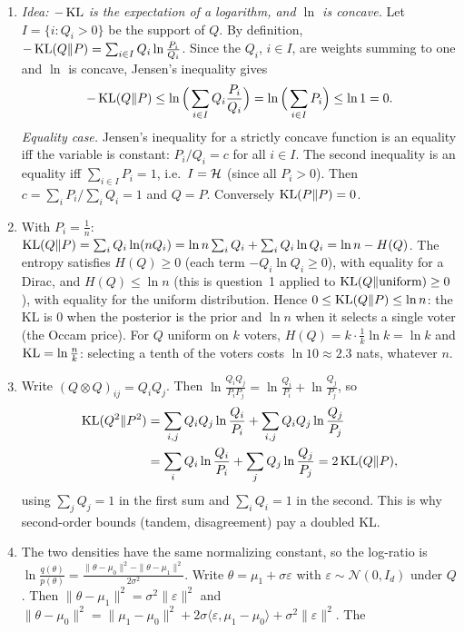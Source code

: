 \documentclass[11pt]{article}
\begin{document}
\begin{solution}
\begin{enumerate}
\item \emph{Idea: $-\operatorname{KL}$ is the expectation of a logarithm, and $\ln$ is concave.} Let $I=\{i:Q_i>0\}$ be the
      support of $Q$. By definition, $-\operatorname{KL}(Q\|P)=\sum_{i\in I}Q_i\ln\frac{P_i}{Q_i}$. Since the $Q_i$, $i\in I$, are
      weights summing to one and $\ln$ is concave, Jensen's inequality gives
      \[-\operatorname{KL}(Q\|P)\leq\ln\Big(\sum_{i\in I}Q_i\frac{P_i}{Q_i}\Big)=\ln\Big(\sum_{i\in I}P_i\Big)\leq\ln1=0.\]
      \emph{Equality case.} Jensen's inequality for a strictly concave function is an equality iff the variable is
      constant: $P_i/Q_i=c$ for all $i\in I$. The second inequality is an equality iff $\sum_{i\in I}P_i=1$, i.e.\
      $I=\mathcal{H}$ (since all $P_i>0$). Then $c=\sum_iP_i/\sum_iQ_i=1$ and $Q=P$. Conversely $\operatorname{KL}(P\|P)=0$.
\item With $P_i=\frac1n$: $\operatorname{KL}(Q\|P)=\sum_iQ_i\ln(nQ_i)=\ln n\sum_iQ_i+\sum_iQ_i\ln Q_i=\ln n-H(Q)$.
      The entropy satisfies $H(Q)\geq0$ (each term $-Q_i\ln Q_i\geq0$), with equality for a Dirac, and
      $H(Q)\leq\ln n$ (this is question~1 applied to $\operatorname{KL}(Q\|\text{uniform})\geq0$), with equality for the uniform
      distribution. Hence $0\leq\operatorname{KL}(Q\|P)\leq\ln n$: the KL is $0$ when the posterior is the prior and $\ln n$ when it
      selects a single voter (the Occam price). For $Q$ uniform on $k$ voters, $H(Q)=k\cdot\frac1k\ln k=\ln k$ and
      $\operatorname{KL}=\ln\frac nk$: selecting a tenth of the voters costs $\ln10\approx2.3$ nats, whatever $n$.
\item Write $(Q\otimes Q)_{ij}=Q_iQ_j$. Then $\ln\frac{Q_iQ_j}{P_iP_j}=\ln\frac{Q_i}{P_i}+\ln\frac{Q_j}{P_j}$, so
      \begin{align*}\operatorname{KL}(Q^2\|P^2)&=\sum_{i,j}Q_iQ_j\ln\frac{Q_i}{P_i}+\sum_{i,j}Q_iQ_j\ln\frac{Q_j}{P_j}\\
      &=\sum_iQ_i\ln\frac{Q_i}{P_i}+\sum_jQ_j\ln\frac{Q_j}{P_j}=2\operatorname{KL}(Q\|P),\end{align*}
      using $\sum_jQ_j=1$ in the first sum and $\sum_iQ_i=1$ in the second. This is why second-order bounds
      (tandem, disagreement) pay a doubled KL.
\item The two densities have the same normalizing constant, so the log-ratio is
      $\ln\frac{q(\theta)}{p(\theta)}=\frac{\|\theta-\mu_0\|^2-\|\theta-\mu_1\|^2}{2\sigma^2}$. Write
      $\theta=\mu_1+\sigma\varepsilon$ with $\varepsilon\sim\mathcal N(0,I_d)$ under $Q$. Then
      $\|\theta-\mu_1\|^2=\sigma^2\|\varepsilon\|^2$ and
      $\|\theta-\mu_0\|^2=\|\mu_1-\mu_0\|^2+2\sigma\langle\varepsilon,\mu_1-\mu_0\rangle+\sigma^2\|\varepsilon\|^2$. The

\end{enumerate}
\end{solution}
\end{document}
